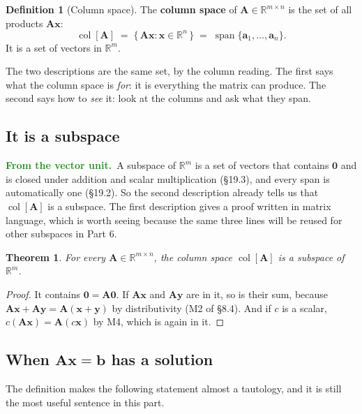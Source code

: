 \documentclass[11pt]{article}
\theoremstyle{plain}
\newtheorem{thm}{Theorem}[section]
\theoremstyle{definition}
\newtheorem{defn}{Definition}[section]
\theoremstyle{remark}
\newcommand{\lookback}[1][the vector unit]{\par\smallskip\noindent
  \textbf{\sffamily\textcolor{ForestGreen}{From #1.}}\ \ignorespaces}
\newcommand{\R}{\mathbb{R}}
\newcommand{\vc}[1]{\mathbf{#1}}        %
\newcommand{\mt}[1]{\mathbf{#1}}        %
\newcommand{\colsp}[1]{\operatorname{col}[#1]}
\DeclareMathOperator{\spanop}{span}
\begin{document}
\begin{defn}[Column space]
The \textbf{column space} of $\mt{A}\in\R^{m\times n}$ is the set of all
products $\mt{A}\vc{x}$:
\[
  \colsp{\mt{A}}
  \;=\; \{\,\mt{A}\vc{x} : \vc{x}\in\R^{n}\,\}
  \;=\; \spanop\{\vc{a}_1,\dots,\vc{a}_n\} .
\]
It is a set of vectors in $\R^{m}$.
\end{defn}

\noindent The two descriptions are the same set, by the column reading. The
first says what the column space is \emph{for}: it is everything the matrix can
produce. The second says how to \emph{see} it: look at the columns and ask what
they span.

\subsection{It is a subspace}
\lookback A subspace of $\R^{m}$ is a set of vectors that contains $\vc{0}$ and
is closed under addition and scalar multiplication (\S19.3), and every span is
automatically one (\S19.2). So the second description already tells us that
$\colsp{\mt{A}}$ is a subspace. The first description gives a proof written in
matrix language, which is worth seeing because the same three lines will be
reused for other subspaces in Part 6.

\begin{thm}
For every $\mt{A}\in\R^{m\times n}$, the column space $\colsp{\mt{A}}$ is a
subspace of $\R^{m}$.
\end{thm}

\begin{proof}
It contains $\vc{0}=\mt{A}\vc{0}$. If $\mt{A}\vc{x}$ and $\mt{A}\vc{y}$ are in
it, so is their sum, because $\mt{A}\vc{x}+\mt{A}\vc{y}=\mt{A}(\vc{x}+\vc{y})$
by distributivity (M2 of \S8.4). And if $c$ is a scalar,
$c(\mt{A}\vc{x})=\mt{A}(c\vc{x})$ by M4, which is again in it.
\end{proof}

\subsection{When \texorpdfstring{$\mt{A}\vc{x}=\vc{b}$}{Ax = b} has a solution}
The definition makes the following statement almost a tautology, and it is
still the most useful sentence in this part.
\end{document}
